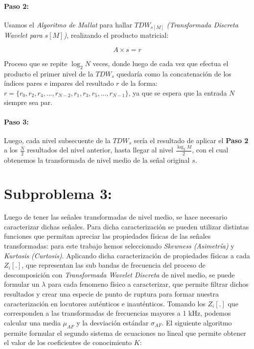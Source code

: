 \documentclass[11pt]{article}
\begin{document}
\paragraph*{Paso 2:}
Usamos el {\it Algoritmo de Mallat} para hallar \(TDW_{s[M]}\) {\it (Transformada Discreta Wavelet para \(s[M]\))}, realizando el producto matricial:

\begin{equation}
    A \times s = r
\end{equation}

Proceso que se repite \(\log_{2}N\) veces, donde luego de cada vez que efectua el producto el primer nivel de la 
\(TDW_{s}\) quedaría como la concatenación de los índices pares e impares del resultado \(r\) de la forma: \(r = \{r_{0}, r_{2}, r_{4}, ..., r_{N - 2}, r_{1}, r_{3}, r_{5}, ..., r_{N - 1}\}\), ya que se espera 
que la entrada \(N\) siempre sea par.

\paragraph*{Paso 3:}
Luego, cada nivel subsecuente de la \(TDW_{s}\) sería el resultado de aplicar el {\bf Paso 2} a los \(\frac{N}{2}\) resultados del nivel anterior, hasta llegar al nivel \(\frac{\log_{2}M}{2}\), con el cual obtenemos la transformada de 
nivel medio de la señal original \(s\).


\section*{Subproblema 3:}
Luego de tener las señales transformadas de nivel medio, se hace necesario caracterizar dichas señales. Para dicha caracterización se pueden utilizar distintas funciones que permitan apreciar las propiedades físicas de las señales 
transformadas: para este trabajo hemos seleccionado {\it Skewness (Asimetría)} y {\it Kurtosis (Curtosis)}. Aplicando dicha caracterización de propiedades físicas a cada \(Z_{i}[.]\), que representan las sub bandas de frecuencia del proceso de descomposición 
con {\it Transformada Wavelet Discreta} de nivel medio, se puede formular un \(\lambda\) para cada fenomeno físico a caracterizar, que permite filtrar dichos resultados y crear una especie de punto de ruptura para formar nuestra caracterización en locutores auténticos e 
inauténticos. Tomando los \(Z_{i}[.]\) que corresponden a las transformadas de frecuencias mayores a 1 kHz, podemos calcular una media \(\mu_{AF}\) y la desviación estándar \(\sigma_{AF}\). El siguiente algoritmo permite formular el segundo 
sistema de ecuaciones no lineal que permite obtener el valor de los coeficientes de conocimiento \(K\):
\end{document}
